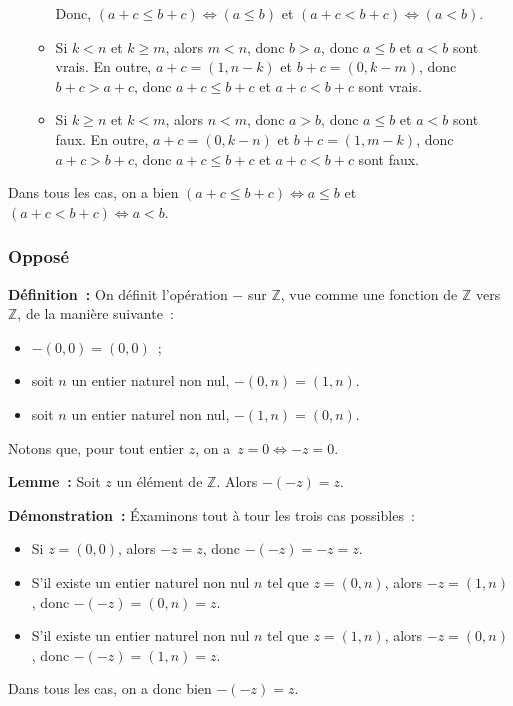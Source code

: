 \begin{itemize}[nosep]
\begin{itemize}[nosep]
                    Donc, $(a+c \leq b+c) \Leftrightarrow (a \leq b)$ et $(a+c < b+c) \Leftrightarrow (a < b)$. 
                \item Si $k < n$ et $k \geq m$, alors $m < n$, donc $b > a$, donc $a \leq b$ et $a < b$ sont vrais.
                    En outre, $a+c = (1, n-k)$ et $b + c = (0, k-m)$, donc $b+c > a+c$, donc $a+c \leq b+c$ et $a+c < b+c$ sont vrais.
                \item Si $k \geq n$ et $k < m$, alors $n < m$, donc $a > b$, donc $a \leq b$ et $a < b$ sont faux.
                    En outre, $a+c = (0, k-n)$ et $b + c = (1, m-k)$, donc $a+c > b+c$, donc $a+c \leq b+c$ et $a+c < b+c$ sont faux.
            \end{itemize}
    \end{itemize}
    Dans tous les cas, on a bien $(a+c \leq b+c) \Leftrightarrow a \leq b$ et $(a+c < b+c) \Leftrightarrow a < b$.
    
    \done

\subsubsection{Opposé}

\noindent\textbf{Définition :} On définit l'opération $-$ sur $\mathbb{Z}$, vue comme une fonction de $\mathbb{Z}$ vers $\mathbb{Z}$, de la manière suivante : 
\begin{itemize}[nosep]
    \item $-(0,0) = (0,0)$ ;
    \item soit $n$ un entier naturel non nul, $-(0,n) = (1,n)$.
    \item soit $n$ un entier naturel non nul, $-(1,n) = (0,n)$.
\end{itemize}
Notons que, pour tout entier $z$, on a $z = 0 \Leftrightarrow -z = 0$.

\medskip

\noindent\textbf{Lemme :} Soit $z$ un élément de $\mathbb{Z}$. 
    Alors $-(-z) = z$.

\medskip

\noindent\textbf{Démonstration :} Éxaminons tout à tour les trois cas possibles : 
\begin{itemize}[nosep]
    \item Si $z = (0,0)$, alors $-z = z$, donc $-(-z) = -z = z$.
    \item S'il existe un entier naturel non nul $n$ tel que $z = (0,n)$, alors $-z = (1,n)$, donc $-(-z) = (0,n) = z$.
    \item S'il existe un entier naturel non nul $n$ tel que $z = (1,n)$, alors $-z = (0,n)$, donc $-(-z) = (1,n) = z$.
\end{itemize}
Dans tous les cas, on a donc bien $-(-z) = z$.

